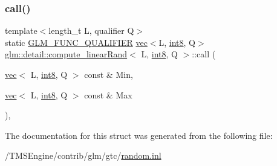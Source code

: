 \subsubsection{\texorpdfstring{call()}{call()}}
{\footnotesize\ttfamily template$<$length\+\_\+t L, qualifier Q$>$ \\
static \hyperlink{setup_8hpp_a33fdea6f91c5f834105f7415e2a64407}{G\+L\+M\+\_\+\+F\+U\+N\+C\+\_\+\+Q\+U\+A\+L\+I\+F\+I\+ER} \hyperlink{structglm_1_1vec}{vec}$<$L, \hyperlink{namespaceglm_1_1detail_a04b526a8d7a9b455602a0afa78c531e0}{int8}, Q$>$ \hyperlink{structglm_1_1detail_1_1compute__linear_rand}{glm\+::detail\+::compute\+\_\+linear\+Rand}$<$ L, \hyperlink{namespaceglm_1_1detail_a04b526a8d7a9b455602a0afa78c531e0}{int8}, Q $>$\+::call (\begin{DoxyParamCaption}\item[{\hyperlink{structglm_1_1vec}{vec}$<$ L, \hyperlink{namespaceglm_1_1detail_a04b526a8d7a9b455602a0afa78c531e0}{int8}, Q $>$ const \&}]{Min,  }\item[{\hyperlink{structglm_1_1vec}{vec}$<$ L, \hyperlink{namespaceglm_1_1detail_a04b526a8d7a9b455602a0afa78c531e0}{int8}, Q $>$ const \&}]{Max }\end{DoxyParamCaption})\hspace{0.3cm}{\ttfamily [inline]}, {\ttfamily [static]}}



The documentation for this struct was generated from the following file\+:\begin{DoxyCompactItemize}
\item 
/\+T\+M\+S\+Engine/contrib/glm/gtc/\hyperlink{random_8inl}{random.\+inl}\end{DoxyCompactItemize}
